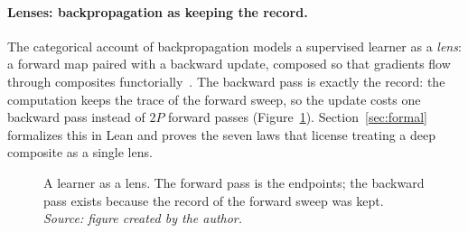 \paragraph{Lenses: backpropagation as keeping the record.} The categorical account of backpropagation models a supervised learner as a \emph{lens}: a forward map paired with a backward update, composed so that gradients flow through composites functorially~\cite{fong2019backprop,cruttwell2022categorical}. The backward pass is exactly the record: the computation keeps the trace of the forward sweep, so the update costs one backward pass instead of $2P$ forward passes (Figure~\ref{fig:lens}). Section~\ref{sec:formal} formalizes this in Lean and proves the seven laws that license treating a deep composite as a single lens.

\begin{figure}[htbp]
\centering
{}
\caption{A learner as a lens. The forward pass is the endpoints; the backward pass exists because the record of the forward sweep was kept. \emph{Source: figure created by the author.}}
\label{fig:lens}
\end{figure}

